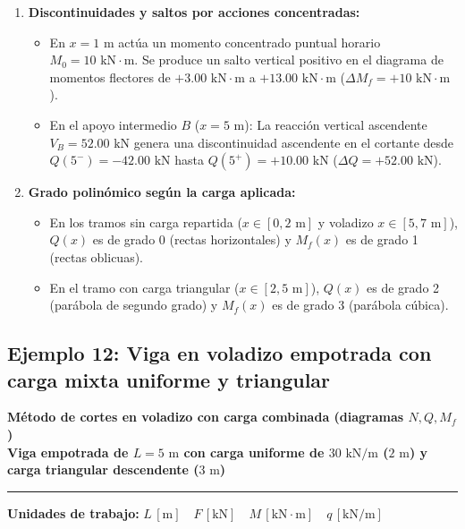 {\begin{enumerate}
        \item \textbf{Discontinuidades y saltos por acciones concentradas:}
              \begin{itemize}
                  \item En $x = 1\text{ m}$ actúa un momento concentrado puntual horario $M_0 = 10\text{ kN}\cdot\text{m}$. Se produce un salto vertical positivo en el diagrama de momentos flectores de $+3.00\text{ kN}\cdot\text{m}$ a $+13.00\text{ kN}\cdot\text{m}$ ($\Delta M_f = +10\text{ kN}\cdot\text{m}$).
                  \item En el apoyo intermedio $B$ ($x = 5\text{ m}$): La reacción vertical ascendente $V_B = 52.00\text{ kN}$ genera una discontinuidad ascendente en el cortante desde $Q(5^-) = -42.00\text{ kN}$ hasta $Q(5^+) = +10.00\text{ kN}$ ($\Delta Q = +52.00\text{ kN}$).
              \end{itemize}

        \item \textbf{Grado polinómico según la carga aplicada:}
              \begin{itemize}
                  \item En los tramos sin carga repartida ($x \in [0, 2\text{ m}]$ y voladizo $x \in [5, 7\text{ m}]$), $Q(x)$ es de grado 0 (rectas horizontales) y $M_f(x)$ es de grado 1 (rectas oblicuas).
                  \item En el tramo con carga triangular ($x \in [2, 5\text{ m}]$), $Q(x)$ es de grado 2 (parábola de segundo grado) y $M_f(x)$ es de grado 3 (parábola cúbica).
              \end{itemize}
    \end{enumerate}
}


\subsection{Ejemplo 12: Viga en voladizo empotrada con carga mixta uniforme y triangular}

\begin{tcolorbox}[colback=blue!3!white, colframe=blue!40!black, arc=3pt, boxrule=0.8pt, left=8pt, right=8pt, top=6pt, bottom=6pt]
    \centering
    {\Large\bfseries\color{blue!60!black} Método de cortes en voladizo con carga combinada (diagramas $N, Q, M_f$)}\\[2pt]
    {\normalsize\bfseries Viga empotrada de $L = 5\text{ m}$ con carga uniforme de $30\text{ kN/m}$ ($2\text{ m}$) y carga triangular descendente ($3\text{ m}$)}

    \vspace{4pt}\hrule\vspace{4pt}
    {\small\textbf{Unidades de trabajo:} $L\,[\text{m}] \quad F\,[\text{kN}] \quad M\,[\text{kN}\cdot\text{m}] \quad q\,[\text{kN/m}]$}
\end{tcolorbox}

